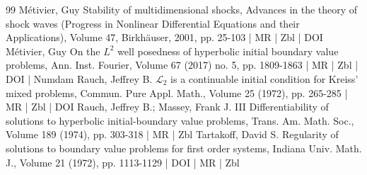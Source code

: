 \begin{thebibliography}{99}
Métivier, Guy Stability of multidimensional shocks, Advances in the theory of shock waves (Progress in Nonlinear Differential Equations and their Applications), Volume 47, Birkhäuser, 2001, pp. 25-103 | MR | Zbl | DOI
Métivier, Guy On the ${L}^2$ well posedness of hyperbolic initial boundary value problems, Ann. Inst. Fourier, Volume 67 (2017) no. 5, pp. 1809-1863 | MR | Zbl | DOI | Numdam
Rauch, Jeffrey B. ${\mathcal{L}}_{2}$ is a continuable initial condition for Kreiss’ mixed problems, Commun. Pure Appl. Math., Volume 25 (1972), pp. 265-285 | MR | Zbl | DOI
Rauch, Jeffrey B.; Massey, Frank J. III Differentiability of solutions to hyperbolic initial-boundary value problems, Trans. Am. Math. Soc., Volume 189 (1974), pp. 303-318 | MR | Zbl
Tartakoff, David S. Regularity of solutions to boundary value problems for first order systems, Indiana Univ. Math. J., Volume 21 (1972), pp. 1113-1129 | DOI | MR | Zbl
\end{thebibliography}
